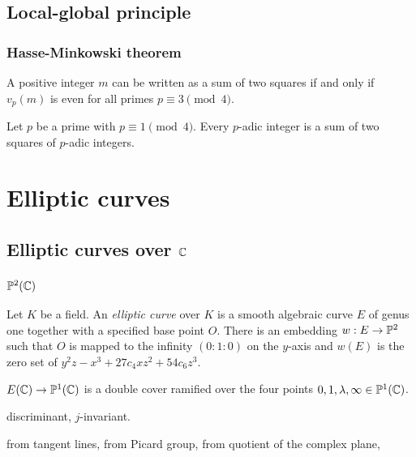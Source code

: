 \documentclass{../../large}
\begin{document}
\chapter{Local-global principle}
\section{Hasse-Minkowski theorem}

\begin{thm}
A positive integer $m$ can be written as a sum of two squares if and only if $v_p(m)$ is even for all primes $p\equiv3\pmod4$.

Let $p$ be a prime with $p\equiv1\pmod4$.
Every $p$-adic integer is a sum of two squares of $p$-adic integers.
\end{thm}





\part{Elliptic curves}
\chapter{Elliptic curves over $\C$}

\section{$\P^2(\C)$}
\begin{prb}
Let $K$ be a field.
An \emph{elliptic curve} over $K$ is a smooth algebraic curve $E$ of genus one together with a specified base point $O$.
There is an embedding $w:E\to\P^2$ such that $O$ is mapped to the infinity $(0:1:0)$ on the $y$-axis and $w(E)$ is the zero set of $y^2z-x^3+27c_4xz^2+54c_6z^3$.
\end{prb}

\begin{prb}
$E(\C)\to\P^1(\C)$ is a double cover ramified over the four points $0,1,\lambda,\infty\in\P^1(\C)$.
\end{prb}

\begin{prb}
discriminant, $j$-invariant.
\end{prb}


\begin{prb}
from tangent lines, from Picard group, from quotient of the complex plane,
\end{prb}
\end{document}
